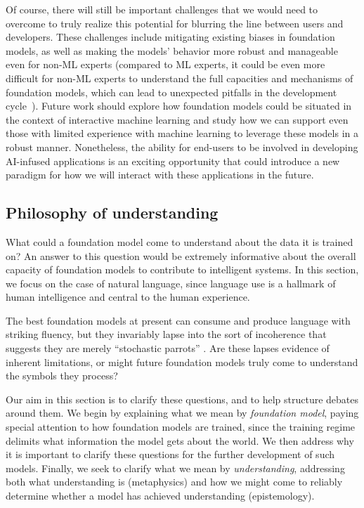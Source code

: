 Of course, there will still be important challenges that we would need to overcome to truly realize this potential for blurring the line between users and developers. These challenges include mitigating existing biases in foundation models, as well as making the models' behavior more robust and manageable even for non-ML experts (compared to ML experts, it could be even more difficult for non-ML experts to understand the full capacities and mechanisms of foundation models, which can lead to unexpected pitfalls in the development cycle~\citep{QianYang2018}). Future work should explore how foundation models could be situated in the context of interactive machine learning and study how we can support even those with limited experience with machine learning to leverage these models in a robust manner. Nonetheless, the ability for end-users to be involved in developing AI-infused applications is an exciting opportunity that could introduce a new paradigm for how we will interact with these applications in the future. 

\newsection
\subsection{Philosophy of understanding}
\label{sec:philosophy}

What could a foundation model come to understand about the data it is trained on? An answer to this question would be extremely informative about the overall capacity of foundation models to contribute to intelligent systems. In this section, we focus on the case of natural language, since language use is a hallmark of human intelligence and central to the human experience. 

The best foundation models at present can consume and produce language with striking fluency, but they invariably lapse into the sort of incoherence that suggests they are merely “stochastic parrots” \citep{bender2021}. Are these lapses evidence of inherent limitations, or might future foundation models truly come to understand the symbols they process?

Our aim in this section is to clarify these questions, and to help structure debates around them. We begin by explaining what we mean by \textit{foundation model}, paying special attention to how foundation models are trained, since the training regime delimits what information the model gets about the world. We then address why it is important to clarify these questions for the further development of such models.  Finally, we seek to clarify what we mean by \textit{understanding}, addressing both what understanding is (metaphysics) and how we might come to reliably determine whether a model has achieved understanding (epistemology).

